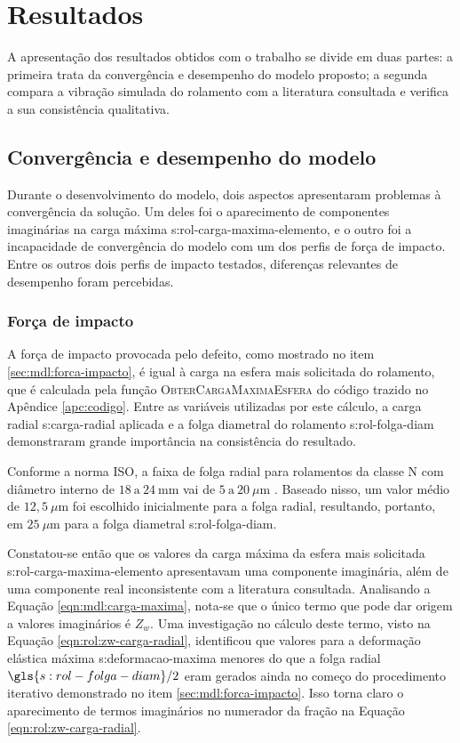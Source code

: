 \documentclass[12pt,oneside,english,brazil,lmodern,siglas,simbolos,cite=num]{ucsmonograph}
\begin{document}
	\chapter{Resultados}
	A apresentação dos resultados obtidos com o trabalho se divide em duas partes: a primeira trata da convergência e desempenho do modelo proposto;
	a segunda compara a vibração simulada do rolamento com a literatura consultada e verifica a sua consistência qualitativa.
	
	\section{Convergência e desempenho do modelo}
	Durante o desenvolvimento do modelo, dois aspectos apresentaram problemas à convergência da solução.
	Um deles foi o aparecimento de componentes imaginárias na carga máxima \gls{s:rol-carga-maxima-elemento}, e o outro foi a incapacidade de convergência do modelo com um dos perfis de força de impacto.
	Entre os outros dois perfis de impacto testados, diferenças relevantes de desempenho foram percebidas.
	
	\subsection{Força de impacto}
	A força de impacto provocada pelo defeito, como mostrado no item \ref{sec:mdl:forca-impacto}, é igual à carga na esfera mais solicitada do rolamento, que é calculada pela função \textsc{ObterCargaMaximaEsfera} do código trazido no Apêndice \ref{apc:codigo}.
	Entre as variáveis utilizadas por este cálculo, a carga radial \gls{s:carga-radial} aplicada e a folga diametral do rolamento \gls{s:rol-folga-diam} demonstraram grande importância na consistência do resultado.
	
	Conforme a norma ISO, a faixa de folga radial para rolamentos da classe N com diâmetro interno de $18\ \text{a}\ 24\ \text{mm}$ vai de $5\ \text{a}\ 20\ \mu\text{m}$ \cite{skf6004}.
	Baseado nisso, um valor médio de $12,5\ \mu\text{m}$ foi escolhido inicialmente para a folga radial, resultando, portanto, em $25\ \mu\text{m}$ para a folga diametral \gls{s:rol-folga-diam}.
	
	Constatou-se então que os valores da carga máxima da esfera mais solicitada \gls{s:rol-carga-maxima-elemento} apresentavam uma componente imaginária, além de uma componente real inconsistente com a literatura consultada.
	Analisando a Equação \ref{eqn:mdl:carga-maxima}, nota-se que o único termo que pode dar origem a valores imaginários é $Z_w$.
	Uma investigação no cálculo deste termo, visto na Equação \ref{eqn:rol:zw-carga-radial}, identificou que valores para a deformação elástica máxima \gls{s:deformacao-maxima} menores do que a folga radial $\gls{s:rol-folga-diam}/2$ eram gerados ainda no começo do procedimento iterativo demonstrado no item \ref{sec:mdl:forca-impacto}.
	Isso torna claro o aparecimento de termos imaginários no numerador da fração na Equação \ref{eqn:rol:zw-carga-radial}.
	
\end{document}
